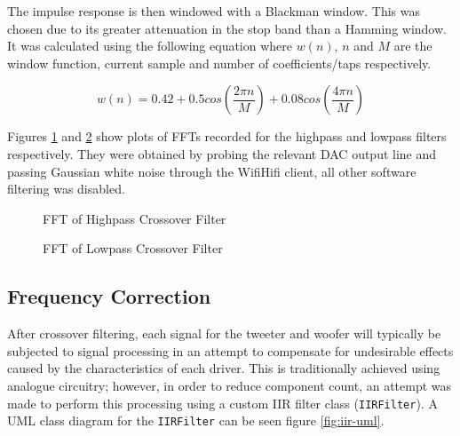 \documentclass[main.tex]{subfiles}
\begin{document}
\medskip
The impulse response is then windowed with a Blackman window.
This was chosen due to its greater attenuation in the stop band than a Hamming window\cite{DSP-berndporr}.
It was calculated using the following equation where $w(n)$, $n$ and $M$ are the window function, current sample and number of coefficients/taps respectively.

\begin{equation}
    w(n)=
    0.42 + 0.5cos\left(\frac{2\pi n}{M}\right) + 0.08cos\left(\frac{4\pi n}{M}\right)
\end{equation}

Figures \ref{fig:tweeter-fft} and \ref{fig:woofer-fft} show plots of FFTs recorded for the highpass and lowpass filters respectively.
They were obtained by probing the relevant DAC output line and passing Gaussian white noise through the WifiHifi client, all other software filtering was disabled.

\begin{figure}[H]
    \centering
    \caption{FFT of Highpass Crossover Filter}
    \label{fig:tweeter-fft}
\end{figure}

\begin{figure}[H]
    \centering
    \caption{FFT of Lowpass Crossover Filter}
    \label{fig:woofer-fft}
\end{figure}

\subsection{Frequency Correction}
After crossover filtering, each signal for the tweeter and woofer will typically be subjected to signal processing in an attempt to compensate for undesirable effects caused by the characteristics of each driver.
This is traditionally achieved using analogue circuitry; however, in order to reduce component count, an attempt was made to perform this processing using a custom IIR filter class (\lstinline{IIRFilter}).
A UML class diagram for the \lstinline{IIRFilter} can be seen figure \ref{fig:iir-uml}.
\end{document}
